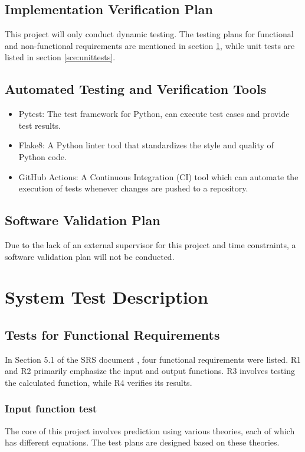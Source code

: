 \documentclass[12pt, titlepage]{article}
\begin{document}
\subsection{Implementation Verification Plan}

This project will only conduct dynamic testing. The testing plans for functional and non-functional requirements are mentioned in section \ref{sec:systests}, while unit tests are listed in section \ref{sce:unittests}.

\subsection{Automated Testing and Verification Tools} \label{sec:autoTnV}

\begin{itemize}
    \item Pytest: The test framework for Python, can execute test cases and provide test results.
    \item Flake8: A Python linter tool that standardizes the style and quality of Python code.
    \item GitHub Actions: A Continuous Integration (CI) tool which can automate the execution of tests whenever changes are pushed to a repository.
\end{itemize}

\subsection{Software Validation Plan} \label{sec:softwarevp}

Due to the lack of an external supervisor for this project and time constraints, a software validation plan will not be conducted.

\section{System Test Description} \label{sec:systests}
	
\subsection{Tests for Functional Requirements}
In Section 5.1 of the SRS document \cite{srs}, four functional requirements were listed. R1 and R2 primarily emphasize the input and output functions. R3 involves testing the calculated function, while R4 verifies its results.

\subsubsection{Input function test}
The core of this project involves prediction using various theories, each of which has different equations. The test plans are designed based on these theories.
\end{document}
